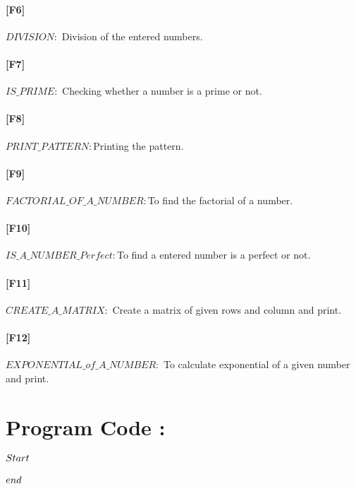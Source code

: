 \documentclass[12pt,a4paper]{article}
\begin{document}
\paragraph{[F6]}$DIVISION:$ Division of the entered numbers.
\\
\paragraph{[F7]}$IS\_PRIME:$ Checking whether a number is a prime or not.
\\
\paragraph{[F8]}$PRINT\_PATTERN:$Printing the pattern.
\\
\paragraph{[F9]}$FACTORIAL\_OF\_A\_NUMBER:$To find the factorial of a number.
\\
\paragraph{[F10]}$IS\_A\_NUMBER\_Perfect:$To find a entered number is a perfect or not.
\\
\paragraph{[F11]}$CREATE\_A\_MATRIX:$ Create a matrix of given rows and column and print.
\\
\paragraph{[F12]}$EXPONENTIAL\_of\_A\_NUMBER:$ To calculate exponential of a given number and print.
\\

\pagebreak

\section{Program Code :}

\paragraph{$\\Start$}
 
\paragraph{$\\end$}
\end{document}
